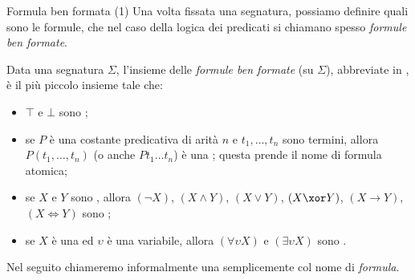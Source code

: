 \documentclass[aspectratio=169,10pt,dvipsnames,xcolor=table,handout]{beamer}
\begin{document}
\begin{frame}{Formula ben formata (1)}
    Una volta fissata una segnatura, possiamo definire quali sono le formule, che nel caso della logica dei predicati si chiamano spesso \emph{formule ben formate}.
    \pause

    \begin{definition}
        Data una segnatura $\Sigma$, l'insieme delle \emph{formule ben formate} (su $\Sigma$), abbreviate in \fbf, è il più piccolo insieme tale che:
        \begin{itemize}
            \item $\top$ e $\bot$ sono \fbf;
            \item se $P$ è una costante predicativa di arità $n$ e $t_1, \ldots, t_n$ sono termini, allora $P(t_1, \ldots, t_n)$ (o anche $Pt_1\ldots t_n$) è una \fbf; questa prende il nome di \alert{formula atomica};
            \item se $X$ e $Y$ sono \fbf, allora $(\neg X)$, $(X \land Y)$, $(X \lor Y)$, $(X \xor Y)$, $(X \to Y)$, $(X \iff Y)$ sono \fbf;
            \item se $X$ è una \fbf ed $\upsilon$ è una variabile, allora $(\forall \upsilon X)$ e $(\exists \upsilon X)$ sono \fbf.
        \end{itemize}
    \end{definition}

    \pause
    Nel seguito chiameremo informalmente una \fbf semplicemente col nome di \emph{formula}.
\end{frame}
\end{document}
